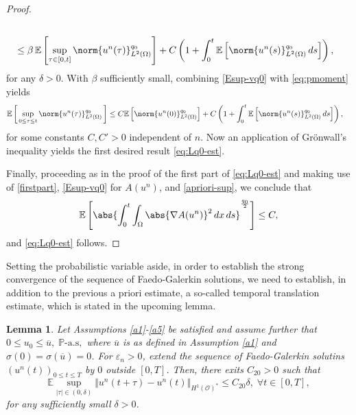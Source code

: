 \documentclass[10pt,number,preprint,times]{elsarticle}
\numberwithin{equation}{section} %
\newtheorem{lem}{Lemma}[section]
\newcommand{\E}{\ensuremath{\Bbb{E}}}
\begin{document}
\begin{proof}
{\begin{equation}
\begin{split}
		\\ & \le \beta \,
		\E \left[ \sup_{\tau\in [0,t]} \norm{u^n(\tau)}_{L^2(\Omega)}^{q_0}\right]
		+C \left(1+\int_0^t \E \left[\norm{u^n(s)}_{L^2(\Omega)}^{q_0} \,ds\right]\right),
	\end{split}
\end{equation}
for any $\delta>0$. With $\beta$ sufficiently small, combining \eqref{Esup-vq0} with \eqref{eq:pmoment} yields
\begin{equation}\label{eq:pmoment2}
	\begin{split}
		\E\left[ \,\sup_{0\le \tau\le t}\norm{u^n(\tau)}_{L^2(\Omega)}^{q_0} \, \right] 
		& \le C\E\left[ \norm{u^n(0)}_{L^2(\Omega)}^{q_0}\right] 
		 +C \left(1+\int_0^t \E \left[\norm{u^n(s)}_{L^2(\Omega)}^{q_0} \,ds\right]\right),
	\end{split}
\end{equation}
for some constants $C,C'>0$ independent of $n$. 
Now an application of Gr\"onwall's inequality 
yields the first desired result \eqref{eq:Lq0-est}.

Finally, proceeding as in the proof of the first part of \eqref{eq:Lq0-est} and making use of \eqref{firstpart}, \eqref{Esup-vq0} for $A(u^n)$, and \eqref{apriori-sup}, we conclude that
$$
\E\left[ \abs{\int_0^t \int_{\Omega}  \abs{\nabla A(u^n)}^2 \,dx \,ds}^{\frac{q_0}{2}}\right] 
\le C,
$$
and \eqref{eq:Lq0-est} follows.
}
\end{proof}
Setting the probabilistic variable aside, in order to establish the strong convergence of the sequence of Faedo-Galerkin solutions, we need to establish, in addition to the previous a priori estimate, a so-called temporal translation estimate, which is stated in the upcoming lemma.
\begin{lem}\label{lémmatranslaté}
	Let Assumptions \ref{a1}-\ref{a5} be satisfied and assume further that $0 \leq u_0 \leq \overline{u},\; \mathbb{P}\text{-a.s},$ where $\overline{u}$ is as defined in Assumption \ref{a1} and $\sigma(0)=\sigma(\overline{u})=0$. For $\varepsilon_n>0$, extend the sequence of Faedo-Galerkin solutins $\left(u^n(t)\right)_{0 \leq t \leq T}$ by $0$ outside $[0,T]$. Then, there exits $C_{20}>0$ such that 
	\begin{equation}\label{tmprl}
		\mathbb{E} \underset{\vert \tau \vert \in (0,\delta)}{\sup} \Vert u^n(t+\tau) -u^n(t)\Vert_{H^1(\mathcal{O})^*}  \leq C_{20} \delta, \; \forall t \in [0,T],
	\end{equation}
	for any sufficiently small $\delta>0$.
\end{lem} 
\end{document}
